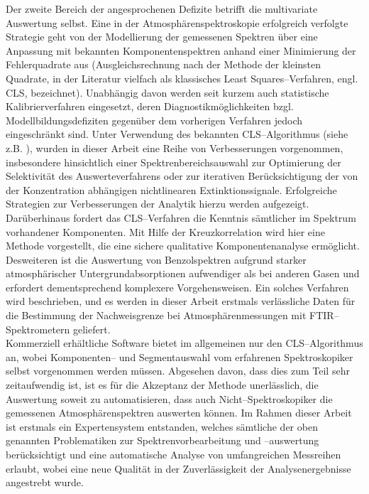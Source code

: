 Der zweite Bereich der angesprochenen Defizite betrifft die
multivariate Auswertung selbst. Eine in der
Atmosph\"{a}renspektroskopie erfolgreich verfolgte Strategie geht von
der Modellierung der gemessenen Spektren \"{u}ber eine Anpassung mit
bekannten Komponentenspektren anhand einer Minimierung der
Fehlerquadrate aus (Ausgleichsrechnung nach der Methode der
kleinsten Quadrate, in der Literatur vielfach als klassisches
Least Squares--Verfahren, engl. CLS, bezeichnet). Unabh\"{a}ngig davon
werden seit kurzem auch statistische Kalibrierverfahren
eingesetzt, deren Diagnostikm\"{o}glichkeiten bzgl.
Modellbildungsdefiziten gegen\"{u}ber dem vorherigen Verfahren jedoch
eingeschr\"{a}nkt sind. Unter Verwendung des bekannten
CLS--Algorithmus (siehe z.B. \cite{saarinen91}), wurden in dieser
Arbeit eine Reihe von Verbesserungen vorgenommen, insbesondere
hinsichtlich einer Spektrenbereichsauswahl zur Optimierung der
Selektivit\"{a}t des Auswerteverfahrens oder zur iterativen
Ber\"{u}cksichtigung der von der Konzentration abh\"{a}ngigen
nichtlinearen Extinktionssignale. Erfolgreiche Strategien zur
Verbesserungen der Analytik hierzu werden aufgezeigt.
Dar\"{u}berhinaus fordert das CLS--Verfahren die Kenntnis s\"{a}mtlicher
im Spektrum vorhandener Komponenten. Mit Hilfe der
Kreuzkorrelation wird hier eine Methode vorgestellt, die eine
sichere qualitative Komponentenanalyse erm\"{o}glicht. Desweiteren ist
die Auswertung von Benzolspektren aufgrund starker atmosph\"{a}rischer
Untergrundabsorptionen aufwendiger als bei anderen Gasen und
erfordert dementsprechend komplexere Vorgehensweisen. Ein solches
Verfahren wird beschrieben, und es werden in dieser Arbeit
erstmals verl\"{a}ssliche Daten f\"{u}r die Bestimmung der Nachweisgrenze
bei Atmosph\"{a}renmessungen mit FTIR--Spektrometern geliefert.\\

Kommerziell erh\"{a}ltliche Software bietet im allgemeinen nur den
CLS--Algorithmus an, wobei Kom\-po\-nen\-ten-- und Segmentauswahl
vom erfahrenen Spektroskopiker selbst vorgenommen werden m\"{u}ssen.
Abgesehen davon, dass dies zum Teil sehr zeitaufwendig ist, ist es
f\"{u}r die Akzeptanz der Methode unerl\"{a}sslich, die Auswertung soweit
zu automatisieren, dass auch Nicht--Spektroskopiker die gemessenen
Atmosph\"{a}renspektren auswerten k\"{o}nnen. Im Rahmen dieser Arbeit ist
erstmals ein Expertensystem entstanden, welches s\"{a}mtliche der oben
genannten Problematiken zur Spektrenvorbearbeitung und
--auswertung ber\"{u}cksichtigt und eine automatische Analyse von
umfangreichen Messreihen erlaubt, wobei eine neue Qualit\"{a}t in der
Zuverl\"{a}ssigkeit der Analysenergebnisse angestrebt wurde.\\

